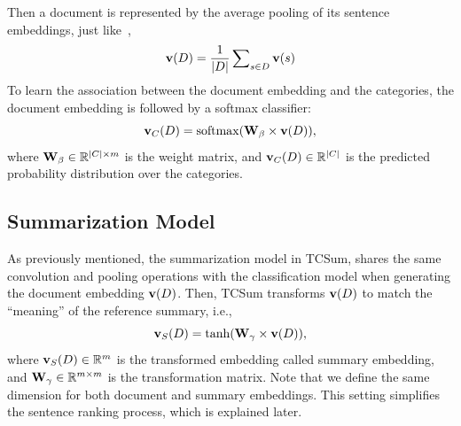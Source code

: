 \documentclass[letterpaper]{article}
\begin{document}
Then a document is represented by the average pooling of its sentence embeddings, just like~\cite{lai2015recurrent},
\begin{equation} \label{eq:documentEmbedding}
{\bf{v}}(D) = \frac{1}{{|D|}}\sum\nolimits_{s \in D} {{\bf{v}}(s)}
\end{equation}
To learn the association between the document embedding and the categories, the document embedding is followed by a softmax classifier:
\begin{equation}\label{eq:classification}
{\bf{v}}_C(D) = {\rm{softmax}}({{\bf{W}}_\beta} \times {\bf{v}}(D)),
\end{equation}
where ${{\bf{W}}_\beta} \in \mathbb{R}^{|C| \times m}$ is the weight matrix, and ${\bf{v}}_C(D) \in \mathbb{R}^{|C|}$ is the predicted probability distribution over the categories.




\subsection{Summarization Model}
As previously mentioned, the summarization model in TCSum, shares the same convolution and pooling operations with the classification model when generating the document embedding ${\bf{v}}(D)$.
Then, TCSum transforms ${\bf{v}}(D)$ to match the ``meaning'' of the reference summary, i.e.,
\begin{equation}
{\bf{v}}_S(D) = {\rm{tanh}}({{\bf{W}}_\gamma} \times {\bf{v}}(D)),
\end{equation}
where ${\bf{v}}_S(D) \in \mathbb{R}^m$ is the transformed embedding called summary embedding, and ${\bf{W}}_\gamma \in \mathbb{R}^{m \times m}$ is the transformation matrix.
Note that we define the same dimension for both document and summary embeddings.
This setting simplifies the sentence ranking process, which is explained later.
\end{document}
